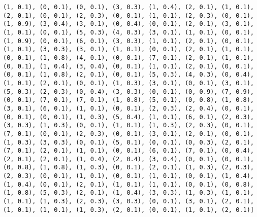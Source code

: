 \documentclass[11pt]{article}
\begin{document}
\begin{Verbatim}[commandchars=\\\{\}]
(1, 0.1), (0, 0.1), (0, 0.1), (3, 0.3), (1, 0.4), (2, 0.1), (1, 0.1), (2, 0.1), (0, 0.1), (2, 0.3), (0, 0.1), (1, 0.1), (2, 0.3), (0, 0.1), (1, 0.9), (3, 0.4), (3, 0.1), (0, 0.4), (0, 0.1), (2, 0.1), (3, 0.1), (1, 0.1), (0, 0.1), (5, 0.3), (4, 0.3), (3, 0.1), (1, 0.1), (0, 0.1), (1, 0.9), (0, 0.1), (6, 0.1), (3, 0.3), (1, 0.1), (2, 0.1), (0, 0.1), (1, 0.1), (3, 0.3), (3, 0.1), (1, 0.1), (0, 0.1), (2, 0.1), (1, 0.1), (0, 0.1), (1, 0.8), (4, 0.1), (0, 0.1), (7, 0.1), (2, 0.1), (1, 0.1), (0, 0.1), (1, 0.4), (3, 0.4), (0, 0.1), (1, 0.1), (2, 0.1), (0, 0.1), (0, 0.1), (1, 0.8), (2, 0.1), (0, 0.1), (5, 0.3), (4, 0.3), (0, 0.4), (1, 0.1), (2, 0.1), (0, 0.1), (1, 0.3), (3, 0.1), (0, 0.1), (3, 0.1), (5, 0.3), (2, 0.3), (0, 0.4), (3, 0.3), (0, 0.1), (0, 0.9), (7, 0.9), (0, 0.1), (7, 0.1), (7, 0.1), (1, 0.8), (5, 0.1), (0, 0.8), (1, 0.8), (3, 0.1), (6, 0.1), (1, 0.1), (0, 0.1), (2, 0.3), (2, 0.4), (0, 0.1), (0, 0.1), (0, 0.1), (1, 0.3), (5, 0.4), (1, 0.1), (6, 0.1), (2, 0.3), (3, 0.3), (1, 0.3), (0, 0.1), (1, 0.1), (1, 0.3), (2, 0.3), (0, 0.1), (7, 0.1), (0, 0.1), (2, 0.3), (0, 0.1), (3, 0.1), (2, 0.1), (0, 0.1), (1, 0.3), (3, 0.3), (0, 0.1), (5, 0.1), (0, 0.1), (0, 0.3), (2, 0.1), (7, 0.1), (2, 0.1), (1, 0.1), (0, 0.1), (6, 0.1), (7, 0.1), (0, 0.4), (2, 0.1), (2, 0.1), (1, 0.4), (2, 0.4), (3, 0.4), (0, 0.1), (0, 0.1), (0, 0.8), (1, 0.8), (1, 0.3), (0, 0.1), (2, 0.1), (1, 0.3), (2, 0.3), (2, 0.3), (0, 0.1), (1, 0.1), (0, 0.1), (1, 0.1), (0, 0.1), (1, 0.4), (1, 0.4), (0, 0.1), (2, 0.1), (1, 0.1), (1, 0.1), (0, 0.1), (0, 0.8), (1, 0.8), (5, 0.3), (2, 0.1), (1, 0.4), (3, 0.3), (1, 0.3), (1, 0.1), (1, 0.1), (1, 0.3), (2, 0.3), (3, 0.3), (0, 0.1), (3, 0.1), (2, 0.1), (1, 0.1), (1, 0.1), (1, 0.3), (2, 0.1), (0, 0.1), (1, 0.1), (2, 0.1)]

\end{Verbatim}
\end{document}

